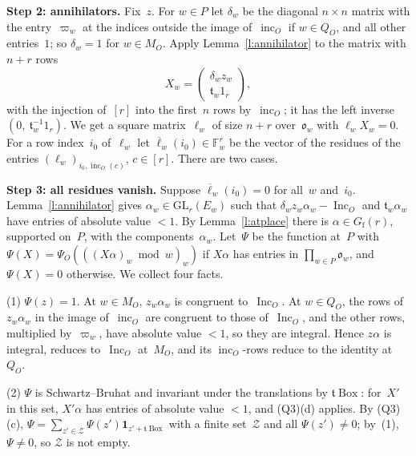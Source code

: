\documentclass[11pt,a4paper]{article}
\newcommand{\m}[1]{\mbox{$#1$}}        %
\newcommand{\subhead}[1]{\par\addvspace{9pt plus 2pt}\Needspace{4\baselineskip}\noindent\textbf{#1}\enspace\ignorespaces}
\theoremstyle{plainx}
\theoremstyle{uprightx}
\newcommand{\FF}{\mathbb{F}}
\newcommand{\oo}{\mathfrak{o}}
\newcommand{\Gfin}[1]{G_{\mathrm{f}}(#1)}
\newcommand{\incO}[1]{\operatorname{inc}_{#1}}
\newcommand{\IncM}[1]{\operatorname{Inc}_{#1}}
\newcommand{\MO}[1]{M_{#1}}
\newcommand{\QO}[1]{Q_{#1}}
\newcommand{\PsiO}[2]{\Psi_{#1}(#2)}
\newcommand{\cosI}[2]{\mathbf{1}_{#2+#1\operatorname{Box}}}
\newcommand{\conj}[1]{\overline{#1}}
\begin{document}
\subhead{Step 2: annihilators.} Fix~$z$. For \m{w\in P} let $\delta_{w}$ be the diagonal \m{n\times n} matrix with
the entry~$\varpi_{w}$ at the indices outside the image of~$\incO{O}$ if \m{w\in\QO{O}}, and all other entries~$1$; so
\m{\delta_{w}=1} for \m{w\in\MO{O}}. Apply Lemma~\ref{l:annihilator} to the matrix with \m{n+r} rows
\[
X_{w}=\begin{pmatrix}\delta_{w}z_{w}\\ \mathfrak{t}_{w}1_{r}\end{pmatrix},
\]
with the injection of~$[r]$ into the first~$n$ rows by~$\incO{O}$; it has the left inverse
\m{(0,\ \mathfrak{t}_{w}^{-1}1_{r})}. We get a square matrix~$\ell_{w}$ of size \m{n+r} over~$\oo_{w}$ with
\m{\ell_{w}X_{w}=0}. For a row index~$i_{0}$ of~$\ell_{w}$ let \m{\conj{\ell}_{w}(i_{0})\in\FF_{w}^{r}} be the vector of the
residues of the entries \m{(\ell_{w})_{i_{0},\incO{O}(c)}}, \m{c\in[r]}. There are two cases.

\subhead{Step 3: all residues vanish.} Suppose \m{\conj{\ell}_{w}(i_{0})=0} for all~$w$ and~$i_{0}$. Lemma~\ref{l:annihilator}
gives \m{\alpha_{w}\in\mathrm{GL}_{r}(E_{w})} such that \m{\delta_{w}z_{w}\alpha_{w}-\IncM{O}} and \m{\mathfrak{t}_{w}\alpha_{w}} have
entries of absolute value \m{<1}. By Lemma~\ref{l:atplace} there is \m{\alpha\in\Gfin{r}}, supported on~$P$, with
the components~$\alpha_{w}$. Let~$\Psi$ be the function at~$P$ with
\m{\Psi(X)=\PsiO{O}{((X\alpha)_{w}\bmod w)_{w}}} if \m{X\alpha} has entries in \m{\prod_{w\in P}\oo_{w}}, and \m{\Psi(X)=0}
otherwise. We collect four facts.

(1) \m{\Psi(z)=1}. At \m{w\in\MO{O}}, \m{z_{w}\alpha_{w}} is congruent to~\m{\IncM{O}}. At \m{w\in\QO{O}}, the rows of
\m{z_{w}\alpha_{w}} in the image of~$\incO{O}$ are congruent to those of~\m{\IncM{O}}, and the other rows, multiplied
by~$\varpi_{w}$, have absolute value \m{<1}, so they are integral. Hence \m{z\alpha} is integral, reduces to~\m{\IncM{O}}
at~$\MO{O}$, and its $\incO{O}$-rows reduce to the identity at~$\QO{O}$.

(2) $\Psi$ is Schwartz--Bruhat and invariant under the translations by \m{\mathfrak{t}\operatorname{Box}}: for~$X'$
in this set, \m{X'\alpha} has entries of absolute value \m{<1}, and (Q3)(d) applies. By (Q3)(c),
\m{\Psi=\sum_{z'\in\mathcal{Z}}\Psi(z')\cosI{\mathfrak{t}}{z'}} with a finite set~$\mathcal{Z}$ and all \m{\Psi(z')\ne0}; by~(1),
$\Psi\ne0$, so $\mathcal{Z}$ is not empty.
\end{document}

